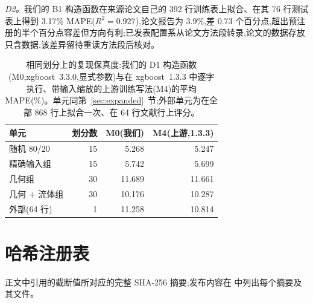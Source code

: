 \documentclass[11pt,a4paper]{ctexart}
\begin{document}
\emph{D2。}我们的 B1 构造函数在来源论文自己的 392 行训练表上拟合、在其 76 行测试表上得到 3.17\% MAPE($R^2=0.927$),论文报告为 3.9\%,差 0.73 个百分点,超出预注册的半个百分点容差但方向有利;已发表配置系从论文方法段转录,论文的数据存放只含数据,该差异留待重读方法段后核对。
\par\endgroup

\begin{table}[htbp]
\centering\small
\caption{相同划分上的复现保真度:我们的 D1 构造函数(M0,xgboost~3.3.0,显式参数)与在 xgboost~1.3.3 中逐字执行、带输入缩放的上游训练写法(M4)的平均 MAPE(\%)。单元同第~\ref{sec:expanded}~节;外部单元为在全部 868 行上拟合一次、在 64 行文献行上评分。}
\label{tab:fidelity}
\begin{tabular}{lrrr}
\toprule
单元 & 划分数 & M0(我们) & M4(上游,1.3.3) \\
\midrule
随机 80/20 & 15 & 5.268 & 5.247 \\
精确输入组 & 15 & 5.742 & 5.699 \\
几何组 & 30 & 11.689 & 11.661 \\
几何 + 流体组 & 30 & 10.176 & 10.287 \\
外部(64 行) & 1 & 11.258 & 10.814 \\
\bottomrule
\end{tabular}
\end{table}

\section{哈希注册表}
\label{app:hashes}

正文中引用的截断值所对应的完整 SHA-256 摘要;发布内容在  中列出每个摘要及其文件。
\end{document}
